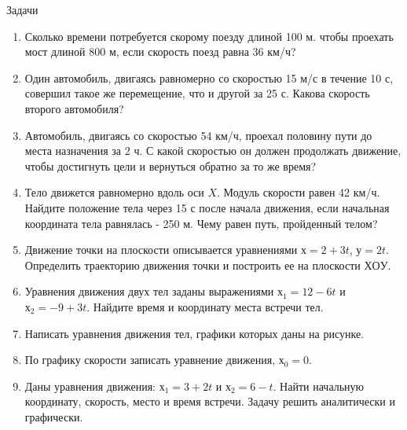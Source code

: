 \documentclass[a5paper, 10pt]{diss_4}
\renewcommand{\'}{\,'}
\begin{document}
\begin{center}
   Задачи
\end{center}
\begin{enumerate}
\item Сколько времени потребуется скорому поезду длиной 100 м. чтобы проехать
мост длиной 800 м, если скорость поезд равна 36 км/ч?

\item Один автомобиль, двигаясь равномерно со скоростью 15 м/с в течение 10 с,
совершил такое же перемещение, что и другой за 25 с. Какова скорость второго автомобиля?

\item Автомобиль, двигаясь со скоростью 54 км/ч, проехал половину пути до места
назначения за 2 ч. С какой скоростью он должен продолжать движение, чтобы
достигнуть цели и вернуться обратно за то же время?

\item Тело движется равномерно вдоль оси $X$. Модуль скорости равен 42 км/ч.
Найдите положение тела через 15 с после начала движения, если начальная
координата тела равнялась - 250 м. Чему равен путь, пройденный телом?

\item Движение точки на плоскости описывается уравнениями $х = 2 + 3t$, $у = 2t$.
Определить траекторию движения точки и построить ее на плоскости $ХОУ$.

\item Уравнения движения двух тел заданы выражениями $х_1 = 12 - 6t$ и
$х_2 = -9 + 3t$. Найдите время и координату места встречи тел.

\item Написать уравнения движения тел, графики которых даны на рисунке.

\item По графику скорости записать уравнение движения, $х_0=0$.


\item Даны уравнения движения: $х_1 = 3 +2t$ и $х_2 = 6 - t$. Найти начальную
координату, скорость, место и время встречи. Задачу решить аналитически и
графически.
\end{enumerate}
\end{document}
